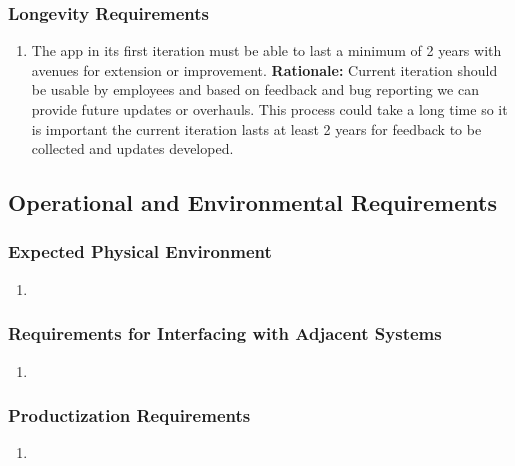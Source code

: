 \documentclass[]{article}
\begin{document}
\subsubsection{Longevity Requirements}
\label{ssub:longevity_requirements}
\begin{enumerate}[{PR-L}1. ]
	\item The app in its first iteration must be able to last a minimum of 2 years with avenues for extension or improvement. \newline
	      \textbf{Rationale:} Current iteration should be usable by employees and based on feedback and bug reporting we can provide future updates or overhauls. This process could take a long time so it is important the current iteration lasts at least 2 years for feedback to be collected and updates developed.

\end{enumerate}


\subsection{Operational and Environmental Requirements}
\label{sub:operational_and_environmental_requirements}

\subsubsection{Expected Physical Environment}
\label{ssub:expected_physical_environment}
\begin{enumerate}[{OE-EPE}1. ]
	\item
\end{enumerate}

\subsubsection{Requirements for Interfacing with Adjacent Systems}
\label{ssub:requirements_for_interfacing_with_adjacent_systems}
\begin{enumerate}[{OE-IA}1. ]
	\item
\end{enumerate}

\subsubsection{Productization Requirements}
\label{ssub:productization_requirements}
\begin{enumerate}[{OE-P}1. ]
	\item
\end{enumerate}
\end{document}
